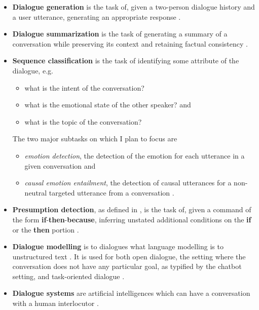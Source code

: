 \documentclass[12pt]{report}
\begin{document}
\begin{itemize}[nolistsep]
    \item
        \textbf{Dialogue generation} is the task of, given a two-person dialogue history and a user utterance, generating an appropriate response \cite{Li2016-ef}.
    \item 
        \textbf{Dialogue summarization} is the task of generating a summary of a conversation while preserving its context \cite{Kim2022-pz} and retaining factual consistency \cite{Richardson2023-mq}.
    \item 
        \textbf{Sequence classification} is the task of identifying some attribute of the dialogue, e.g.
        \begin{itemize}[nolistsep]
            \item what is the intent of the conversation?
            \item what is the emotional state of the other speaker? and
            \item what is the topic of the conversation?
        \end{itemize}
        The two major subtasks on which I plan to focus are
        \begin{itemize}[nolistsep]
            \item \textit{emotion detection}, the detection of the emotion for each utterance in a given conversation \cite{Yi2022-tv} and
            \item \textit{causal emotion entailment}, the detection of causal utterances for a non-neutral targeted utterance from a conversation \cite{Richardson2023-mq,Li2022-jr}.
        \end{itemize}
    \item
        \textbf{Presumption detection}, as defined in \cite{Arabshahi2021-oz}, is the task of, given a command of the form \textbf{if}-\textbf{then}-\textbf{because}, inferring unstated additional conditions on the \textbf{if} or the \textbf{then} portion \cite{Arabshahi2021-oz}.
    \item
        \textbf{Dialogue modelling} is to dialogues what language modelling is to unstructured text \cite{Richardson2023-mq}.
        It is used for both open dialogue, the setting where the conversation does not have any particular goal, as typified by the chatbot setting, and task-oriented dialogue \cite{Richardson2023-mq}.
    \item
        \textbf{Dialogue systems} are artificial intelligences which can have a conversation with a human interlocutor \cite{Ni2023-jk}.

\end{itemize}
\end{document}
